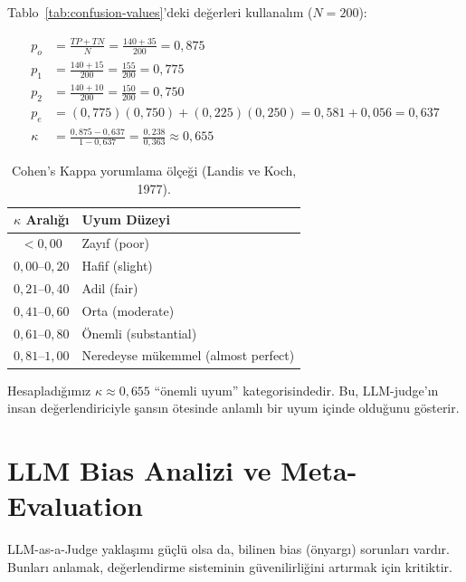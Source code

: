 Tablo~\ref{tab:confusion-values}'deki de\u{g}erleri kullanal{\i}m ($N = 200$):

\begin{align}
p_o &= \frac{TP + TN}{N} = \frac{140 + 35}{200} = 0{,}875 \\[4pt]
p_1 &= \frac{140 + 15}{200} = \frac{155}{200} = 0{,}775 \\[4pt]
p_2 &= \frac{140 + 10}{200} = \frac{150}{200} = 0{,}750 \\[4pt]
p_e &= (0{,}775)(0{,}750) + (0{,}225)(0{,}250) = 0{,}581 + 0{,}056 = 0{,}637 \\[4pt]
\kappa &= \frac{0{,}875 - 0{,}637}{1 - 0{,}637} = \frac{0{,}238}{0{,}363} \approx 0{,}655
\end{align}

\begin{table}[H]
\centering
\caption{Cohen's Kappa yorumlama \"{o}l\c{c}e\u{g}i (Landis ve Koch, 1977).}
\label{tab:kappa-scale}
\begin{tabular}{cl}
\toprule
\textbf{$\kappa$ Aral{\i}\u{g}{\i}} & \textbf{Uyum D\"{u}zeyi} \\
\midrule
$< 0{,}00$ & Zay{\i}f (poor) \\
$0{,}00$--$0{,}20$ & Hafif (slight) \\
$0{,}21$--$0{,}40$ & Adil (fair) \\
$0{,}41$--$0{,}60$ & Orta (moderate) \\
$0{,}61$--$0{,}80$ & \"{O}nemli (substantial) \\
$0{,}81$--$1{,}00$ & Neredeyse m\"{u}kemmel (almost perfect) \\
\bottomrule
\end{tabular}
\end{table}

\noindent Hesaplad{\i}\u{g}{\i}m{\i}z $\kappa \approx 0{,}655$ ``\"{o}nemli uyum'' kategorisindedir. Bu, LLM-judge'{\i}n insan de\u{g}erlendiriciyle \c{s}ans{\i}n \"{o}tesinde anlaml{\i} bir uyum i\c{c}inde oldu\u{g}unu g\"{o}sterir.

\section{LLM Bias Analizi ve Meta-Evaluation}
\label{sec:llm-bias}

LLM-as-a-Judge yakla\c{s}{\i}m{\i} g\"{u}\c{c}l\"{u} olsa da, bilinen bias (\"{o}nyarg{\i}) sorunlar{\i} vard{\i}r. Bunlar{\i} anlamak, de\u{g}erlendirme sisteminin g\"{u}venilirli\u{g}ini art{\i}rmak i\c{c}in kritiktir.

